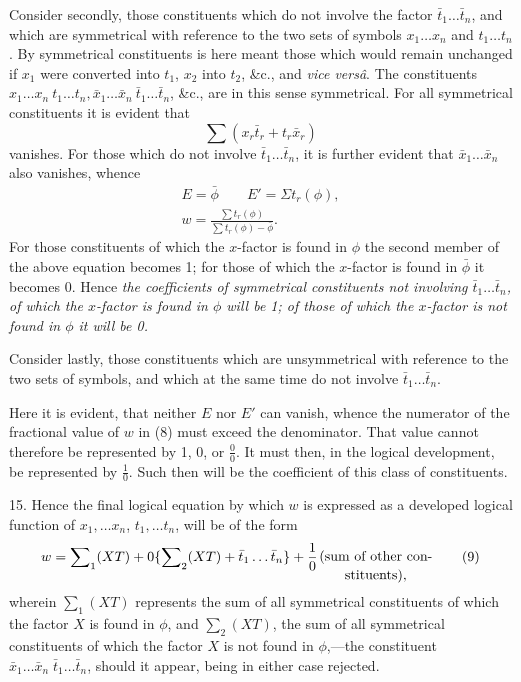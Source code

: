\documentclass[oneside]{book}
\begin{document}
Consider secondly, those constituents which do not involve the
factor $\bar{t}_1 \dotsc \bar{t}_n$, and which are symmetrical with reference to the two
sets of symbols $x_1 \dotsc x_n$ and $t_1 \dotsc t_n$. By symmetrical constituents
is here meant those which would remain unchanged if $x_1$ were
converted into $t_1$, $x_2$ into $t_2$, \&c., and \textit{vice vers\^{a}}. The constituents
$x_1 \dotsc x_n\ t_1 \dotsc t_n,
\bar{x}_1 \dotsc \bar{x}_n\ \bar{t}_1 \dotsc \bar{t}_n$, \&c., are in this sense symmetrical.
For all symmetrical constituents it is evident that
\[
  \sum (x_r \bar{t}_r + t_r \bar{x}_r)
\]
vanishes. For those which do not involve $\bar{t}_1 \dotsc \bar{t}_n$, it is further
evident that $\bar{x}_1 \dotsc \bar{x}_n$ also vanishes, whence
\begin{gather*}
  E = \bar{\phi} \qquad E' = \Sigma t_r(\phi),   \\
  w = \frac{\sum t_r(\phi)}{ \sum t_r(\phi) - \bar{\phi} }.
\end{gather*}
For those constituents of which the $x$-factor is found in $\phi$ the
second member of the above equation becomes 1; for those of
which the $x$-factor is found in $\bar{\phi}$ it becomes 0. Hence \emph{the coefficients of symmetrical constituents not involving
$\bar{t}_1 \dotsc \bar{t}_n$, of which
the $x$-factor is found in $\phi$ will be 1; of those of which the $x$-factor
is not found in $\phi$ it will be 0.}

Consider lastly, those constituents which are unsymmetrical
with reference to the two sets of symbols, and which at the same
time do not involve $\bar{t}_1 \dotsc \bar{t}_n$.

Here it is evident, that neither $E$ nor $E'$ can vanish, whence
the numerator of the fractional value of $w$ in (8) must exceed
the denominator. That value cannot therefore be represented
by 1, 0, or $\frac{0}{0}$. It must then, in the logical development, be represented by $\frac{1}{0}$. Such then will be the coefficient of this class
of constituents.

15. Hence the final logical equation by which $w$ is expressed
as a developed logical function of
$x_1, \dotsc x_n$, $t_1, \dotsc t_n$, will be of
the form
\[
  w = \sum\nolimits_1 (XT)
  + 0\{ \sum\nolimits_2(XT) + \bar{t}_1\dotsc \bar{t}_n \}
  + \frac{1}{0}
  \text{\raisebox{-1.5ex}{$\genfrac{}{}{0pt}{}{\text{(sum of other con-}}{\text{stituents),}}$}} \tag{9}
\]%
%
wherein $\sum_1 (XT)$ represents the sum of all symmetrical constituents of which the factor $X$ is found in $\phi$, and $\sum_2(XT)$, the
sum of all symmetrical constituents of which the factor $X$ is not
found in $\phi$,---the constituent $\bar{x}_1 \dotsc \bar{x}_n\; \bar{t}_1 \dotsc \bar{t}_n$, should it appear,
being in either case rejected.
\end{document}
